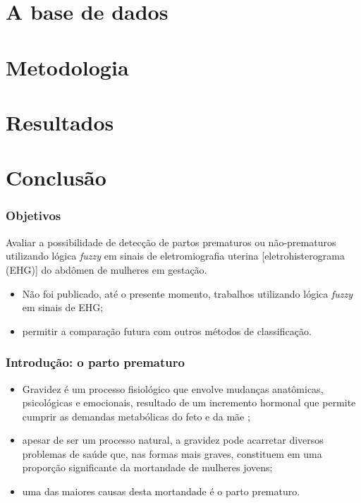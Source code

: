 \documentclass{beamer}
\begin{document}
\section{A base de dados} 



\section{Metodologia} 

\section{Resultados} 

\section{Conclus\~ao} 



\begin{frame}
\frametitle{Objetivos}

Avaliar a possibilidade de detecção de partos prematuros ou não-prematuros utilizando lógica {\em fuzzy} em sinais de eletromiografia uterina [eletrohisterograma (EHG)] do abdômen de mulheres em gestação.

\begin{itemize}
	\item Não foi publicado, até o presente momento, trabalhos utilizando lógica {\em fuzzy} em sinais de EHG;
	\item permitir a comparação futura com outros métodos de classificação.
\end{itemize}

\end{frame}


\begin{frame}
	\frametitle{Introdu\c{c}\~ao: o parto prematuro}	
	
	\begin{itemize}
		\item Gravidez é um processo fisiológico que envolve mudanças anatômicas, psicológicas e emocionais, resultado de um incremento hormonal que permite cumprir as demandas metabólicas do feto e da mãe \cite{p1};
		\item apesar de ser um processo natural, a gravidez pode acarretar diversos problemas de saúde que, nas formas mais graves, constituem em uma proporção significante da mortandade de mulheres jovens;
		\item uma das maiores causas desta mortandade é o parto prematuro.
	\end{itemize}
	
\end{frame}
\end{document}
